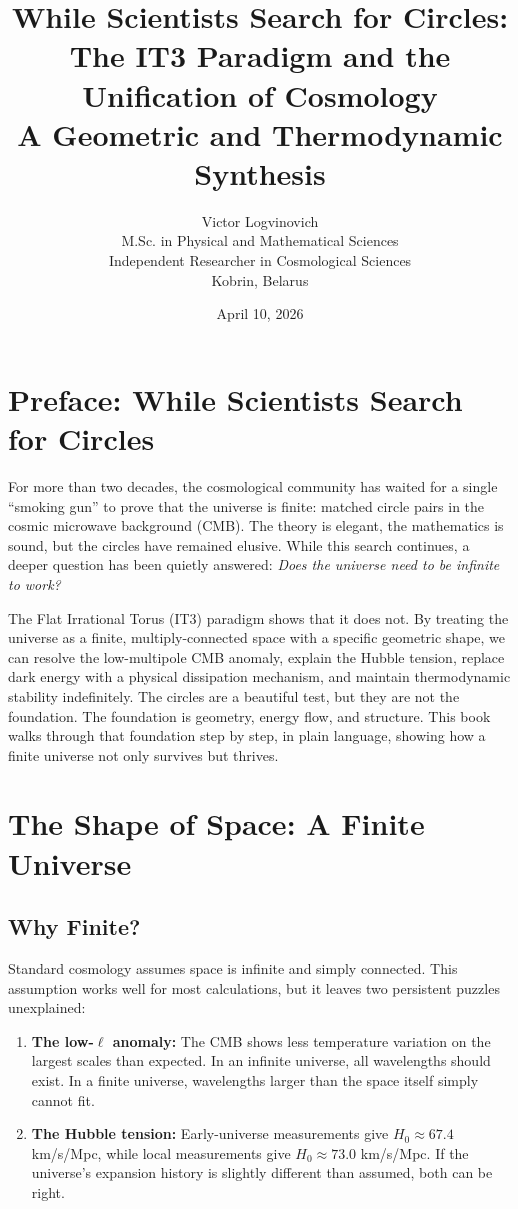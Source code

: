 \documentclass[12pt,a4paper]{report}
\title{\textbf{While Scientists Search for Circles: \\ The IT3 Paradigm and the Unification of Cosmology}\\[0.5cm]
\large A Geometric and Thermodynamic Synthesis}
\author{Victor Logvinovich\\
M.Sc. in Physical and Mathematical Sciences\\
Independent Researcher in Cosmological Sciences\\
Kobrin, Belarus}
\date{April 10, 2026}
\begin{document}
\maketitle
\tableofcontents
\newpage

\chapter*{Preface: While Scientists Search for Circles}
For more than two decades, the cosmological community has waited for a single ``smoking gun'' to prove that the universe is finite: matched circle pairs in the cosmic microwave background (CMB). The theory is elegant, the mathematics is sound, but the circles have remained elusive. While this search continues, a deeper question has been quietly answered: \textit{Does the universe need to be infinite to work?} 

The Flat Irrational Torus (IT3) paradigm shows that it does not. By treating the universe as a finite, multiply-connected space with a specific geometric shape, we can resolve the low-multipole CMB anomaly, explain the Hubble tension, replace dark energy with a physical dissipation mechanism, and maintain thermodynamic stability indefinitely. The circles are a beautiful test, but they are not the foundation. The foundation is geometry, energy flow, and structure. This book walks through that foundation step by step, in plain language, showing how a finite universe not only survives but thrives.

\chapter{The Shape of Space: A Finite Universe}
\section{Why Finite?}
Standard cosmology assumes space is infinite and simply connected. This assumption works well for most calculations, but it leaves two persistent puzzles unexplained:
\begin{enumerate}
    \item \textbf{The low-$\ell$ anomaly:} The CMB shows less temperature variation on the largest scales than expected. In an infinite universe, all wavelengths should exist. In a finite universe, wavelengths larger than the space itself simply cannot fit.
    \item \textbf{The Hubble tension:} Early-universe measurements give $H_0 \approx 67.4$ km/s/Mpc, while local measurements give $H_0 \approx 73.0$ km/s/Mpc. If the universe's expansion history is slightly different than assumed, both can be right.
\end{enumerate}
\end{document}
